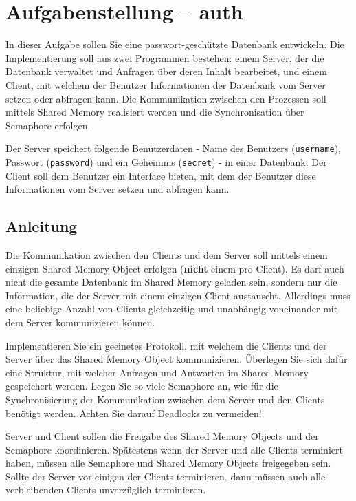 



\section*{Aufgabenstellung -- auth}

In dieser Aufgabe sollen Sie eine passwort-geschützte Datenbank entwickeln. Die
Implementierung soll aus zwei Programmen bestehen: einem Server, der die
Datenbank verwaltet und Anfragen über deren Inhalt bearbeitet, und einem
Client, mit welchem der Benutzer Informationen der Datenbank vom Server setzen
oder abfragen kann. Die Kommunikation zwischen den Prozessen soll mittels
Shared Memory realisiert werden und die Synchronisation über Semaphore
erfolgen.

Der Server speichert folgende Benutzerdaten - Name des Benutzers
(\texttt{username}), Passwort (\texttt{password}) und ein Geheimnis
(\texttt{secret}) - in einer Datenbank. Der Client soll dem Benutzer ein
Interface bieten, mit dem der Benutzer diese Informationen vom Server setzen
und abfragen kann.

\subsection*{Anleitung}

Die Kommunikation zwischen den Clients und dem Server soll mittels einem
einzigen Shared Memory Object erfolgen (\textbf{nicht} einem pro Client). Es
darf auch nicht die gesamte Datenbank im Shared Memory geladen sein,
sondern nur die Information, die der Server mit einem einzigen Client
austauscht. Allerdings muss eine beliebige Anzahl von Clients gleichzeitig und
unabhängig voneinander mit dem Server kommunizieren können.

Implementieren Sie ein geeinetes Protokoll, mit welchem die Clients und der
Server über das Shared Memory Object kommunizieren. Überlegen Sie sich dafür
eine Struktur, mit welcher Anfragen und Antworten im Shared Memory gespeichert
werden. Legen Sie so viele Semaphore an, wie für die Synchronisierung der
Kommunikation zwischen dem Server und den Clients benötigt werden. Achten Sie
darauf Deadlocks zu vermeiden!

Server und Client sollen die Freigabe des Shared Memory Objects und der
Semaphore koordinieren. Spätestens wenn der Server und alle Clients terminiert
haben, müssen alle Semaphore und Shared Memory Objects freigegeben sein.
Sollte der Server vor einigen der Clients terminieren, dann müssen auch alle
verbleibenden Clients unverzüglich terminieren.

